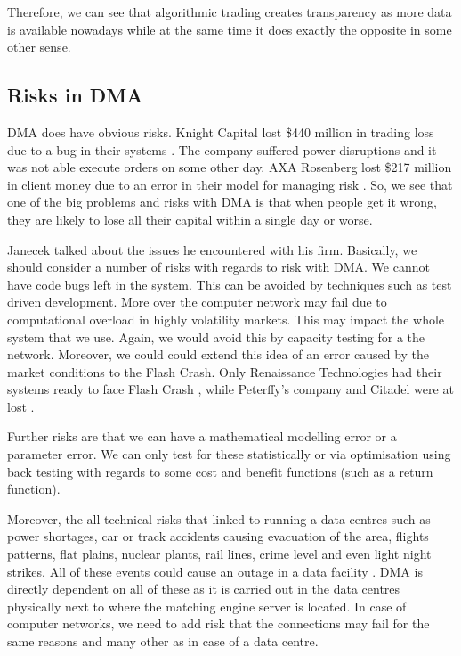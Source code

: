 \documentclass[12pt]{article}
\begin{document}
Therefore, we can see that algorithmic trading creates transparency as more data is available nowadays while at the same time it does exactly the opposite in some other sense.
\subsection*{Risks in DMA}
DMA does have obvious risks. Knight Capital lost \$440 million in trading loss due to a bug in their systems \cite{nytimes}. The company suffered power disruptions and it was not able execute orders on some other day. AXA Rosenberg lost \$217 million in client money due to an error in their model for managing risk \cite{cbs}. So, we see that one of the big problems and risks with DMA is that when people get it wrong, they are likely to lose all their capital within a single day or worse.

Janecek \cite{janecek} talked about the issues he encountered with his firm. Basically, we should consider a number of risks with regards to risk with DMA. We cannot have code bugs left in the system. This can be avoided by techniques such as test driven development. More over the computer network may fail due to computational overload in highly volatility markets. This may impact the whole system that we use. Again, we would avoid this by capacity testing for a the network. Moreover, we could could extend this idea of an error caused by the market conditions to the Flash Crash. Only Renaissance Technologies had their systems ready to face Flash Crash \cite{patterson}, while Peterffy's company and Citadel were at lost \cite{vpro2}.

Further risks are that we can have a mathematical modelling error or a parameter error. We can only test for these statistically or via optimisation using back testing with regards to some cost and benefit functions (such as a return function).

Moreover, the all technical risks that linked to running a data centres such as power shortages, car or track accidents causing evacuation of the area, flights patterns, flat plains, nuclear plants, rail lines, crime level and even light night strikes. All of these events could cause an outage in a data facility \cite{vpro}. DMA is directly dependent on all of these as it is carried out in the data centres physically next to where the matching engine server is located. In case of computer networks, we need to add risk that the connections may fail for the same reasons and many other as in case of a data centre.
\end{document}
